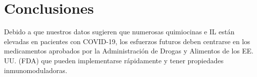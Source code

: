 \section{Conclusiones}

Debido a que nuestros datos sugieren que numerosas quimiocinas e IL están elevadas en pacientes con COVID-19, los esfuerzos futuros deben centrarse en los medicamentos aprobados por la Administración de Drogas y Alimentos de los EE. UU. (FDA) que pueden implementarse rápidamente y tener propiedades inmunomoduladoras.
